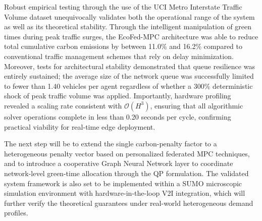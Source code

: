 \documentclass[journal]{IEEEtran}
\begin{document}
Robust empirical testing through the use of the UCI Metro Interstate Traffic Volume dataset unequivocally validates both the operational range of the system as well as its theoretical stability. Through the intelligent manipulation of green times during peak traffic surges, the EcoFed-MPC architecture was able to reduce total cumulative carbon emissions by between 11.0\% and 16.2\% compared to conventional traffic management schemes that rely on delay minimization. Moreover, tests for architectural stability demonstrated that queue resilience was entirely sustained; the average size of the network queue was successfully limited to fewer than 1.40 vehicles per agent regardless of whether a 300\% deterministic shock of peak traffic volume was applied. Importantly, hardware profiling revealed a scaling rate consistent with $\mathcal{O}(H^3)$, ensuring that all algorithmic solver operations complete in less than 0.20 seconds per cycle, confirming practical viability for real-time edge deployment.

The next step will be to extend the single carbon-penalty factor to a heterogeneous penalty vector based on personalized federated MPC techniques, and to introduce a cooperative Graph Neural Network layer to coordinate network-level green-time allocation through the QP formulation. The validated system framework is also set to be implemented within a SUMO microscopic simulation environment with hardware-in-the-loop V2I integration, which will further verify the theoretical guarantees under real-world heterogeneous demand profiles.
\end{document}

